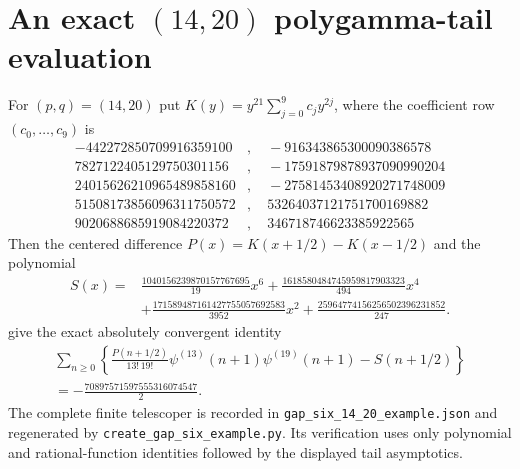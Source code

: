 \section{An exact \texorpdfstring{$(14,20)$}{(14,20)} polygamma-tail evaluation}
\label{example:section}
For $(p,q)=(14,20)$ put $K(y)=y^{21}\sum_{j=0}^{9}c_jy^{2j}$,
where the coefficient row $(c_0,\ldots,c_9)$ is
\[\begin{aligned}
-442272850709916359100&,\quad -916343865300090386578\\
7827122405129750301156&,\quad -17591879878937090990204\\
24015626210965489858160&,\quad -27581453408920271748009\\
51508173856096311750572&,\quad 53264037121751700169882\\
9020688685919084220372&,\quad 346718746623385922565
\end{aligned}\]
Then the centered difference $P(x)=K(x+1/2)-K(x-1/2)$ and the polynomial
\[\begin{aligned}
 S(x)={}&\frac{1040156239870157767695}{19}x^{6}
       +\frac{1618580484745959817903323}{494}x^{4}\\
       &+\frac{171589487161427755057692583}{3952}x^{2}
       +\frac{25964774156256502396231852}{247}.
\end{aligned}\]
give the exact absolutely convergent identity
\[\begin{aligned}
 \sum_{n\ge0}\left\{\frac{P(n+1/2)}{13!\,19!}
 \psi^{(13)}(n+1)\psi^{(19)}(n+1)-S(n+1/2)\right\}\\
 =-\frac{70897571597555316074547}{2}.
\end{aligned}\]
The complete finite telescoper is recorded in \texttt{gap\_six\_14\_20\_example.json} and regenerated by \texttt{create\_gap\_six\_example.py}. Its verification uses only polynomial and rational-function identities followed by the displayed tail asymptotics.
